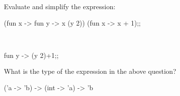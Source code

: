 

\renewcommand\AUTHOR{nweadick1@cougars.ccis.edu} %


\topmattertwo

\nextq
Evaluate and simplify the expression:
\begin{console}
(fun x -> fun y -> x (y 2)) (fun x -> x + 1);;
\end{console}
\\
\ANSWER
\begin{answercode}
fun y -> (y 2)+1;;
\end{answercode}

\nextq
What is the type of the expression in the above question?
\\
\ANSWER
\begin{answercode}
    ('a -> 'b) -> (int -> 'a) -> 'b
\end{answercode}

\newpage


